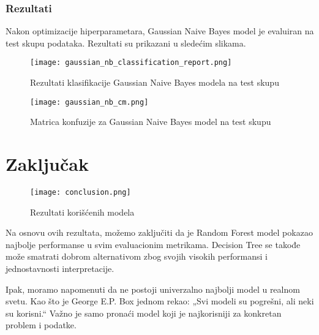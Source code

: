 \documentclass[a4paper,12pt]{article}
\begin{document}
\subsubsection{Rezultati}
Nakon optimizacije hiperparametara, Gaussian Naive Bayes model je evaluiran na test skupu podataka. Rezultati su prikazani u sledećim slikama.

\begin{figure}[H]
\centering
\texttt{[image: gaussian\_nb\_classification\_report.png]}
\caption{Rezultati klasifikacije Gaussian Naive Bayes modela na test skupu}
\label{fig:gaussian_nb_classification_report}
\end{figure}

\begin{figure}[H]
\centering
\texttt{[image: gaussian\_nb\_cm.png]}
\caption{Matrica konfuzije za Gaussian Naive Bayes model na test skupu}
\label{fig:gaussian_nb_cm}
\end{figure}

\section{Zaključak}

\begin{figure}[H]
    \centering
    \texttt{[image: conclusion.png]}
    \caption{Rezultati korišćenih modela}
    \label{fig:enter-label}
\end{figure}

Na osnovu ovih rezultata, možemo zaključiti da je Random Forest model pokazao najbolje performanse u svim evaluacionim metrikama. Decision Tree se takođe može smatrati dobrom alternativom zbog svojih visokih performansi i jednostavnosti interpretacije.

Ipak, moramo napomenuti da ne postoji univerzalno najbolji model u realnom svetu. Kao što je George E.P. Box jednom rekao: „Svi modeli su pogrešni, ali neki su korisni.“ Važno je samo pronaći model koji je najkorisniji za konkretan problem i podatke.
\end{document}
